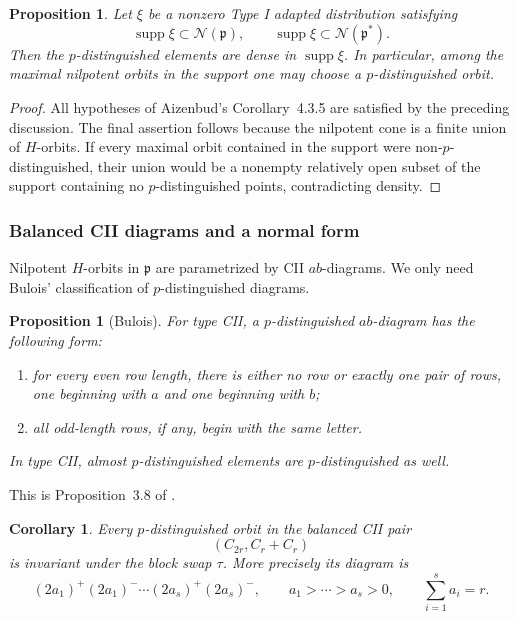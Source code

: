 \documentclass[10pt,a4paper]{amsart}
\numberwithin{equation}{section}
\newtheorem{proposition}[theorem]{Proposition}
\newtheorem{corollary}[theorem]{Corollary}
\newcommand{\supp}{\operatorname{supp}}
\newcommand{\cN}{\mathcal N}
\begin{document}
\begin{proposition}\label{cii:prop:dense-distinguished}
Let \(\xi\) be a nonzero Type I adapted distribution satisfying
\[
\supp\xi\subset\cN(\mathfrak p),
\qquad
\supp\widehat{\xi}\subset\cN(\mathfrak p^*).
\]
Then the \(p\)-distinguished elements are dense in \(\supp\xi\).
In particular, among the maximal nilpotent orbits in the support one may
choose a \(p\)-distinguished orbit.
\end{proposition}

\begin{proof}
All hypotheses of Aizenbud's Corollary~4.3.5 are satisfied by the preceding
discussion.  The final assertion follows because the nilpotent cone is a
finite union of \(H\)-orbits.  If every maximal orbit contained in the
support were non-\(p\)-distinguished, their union would be a nonempty
relatively open subset of the support containing no \(p\)-distinguished
points, contradicting density.
\end{proof}

\subsubsection{Balanced CII diagrams and a normal form}

Nilpotent \(H\)-orbits in \(\mathfrak p\) are parametrized by CII
\(ab\)-diagrams.  We only need Bulois' classification of
\(p\)-distinguished diagrams.

\begin{proposition}[Bulois]\label{cii:prop:bulois}
For type CII, a \(p\)-distinguished \(ab\)-diagram has the following form:
\begin{enumerate}[label=(\roman*)]
\item for every even row length, there is either no row or exactly one
pair of rows, one beginning with \(a\) and one beginning with \(b\);
\item all odd-length rows, if any, begin with the same letter.
\end{enumerate}
In type CII, almost \(p\)-distinguished elements are \(p\)-distinguished as well.
\end{proposition}

This is Proposition~3.8 of \cite{Bulois}.

\begin{corollary}\label{cii:cor:stable-distinguished}
Every \(p\)-distinguished orbit in the balanced CII pair
\[
(C_{2r},C_r+C_r)
\]
is invariant under the block swap \(\tau\).  More precisely its diagram is
\[
(2a_1)^+(2a_1)^-\cdots
(2a_s)^+(2a_s)^-,
\qquad
a_1>\cdots>a_s>0,
\qquad
\sum_{i=1}^s a_i=r.
\]
\end{corollary}
\end{document}
